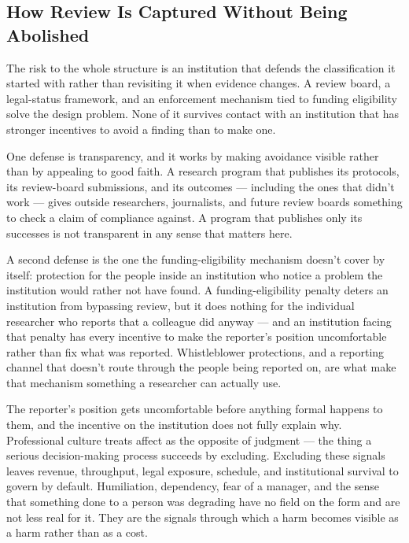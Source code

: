 \subsection{How Review Is Captured Without Being Abolished}
\label{sec:captured-abolished}
The risk to the whole structure is an institution that defends the classification it started with rather than revisiting it when evidence changes. A review board, a legal-status framework, and an enforcement mechanism tied to funding eligibility solve the design problem. None of it survives contact with an institution that has stronger incentives to avoid a finding than to make one.

One defense is transparency, and it works by making avoidance visible rather than by appealing to good faith. A research program that publishes its protocols, its review-board submissions, and its outcomes — including the ones that didn't work — gives outside researchers, journalists, and future review boards something to check a claim of compliance against. A program that publishes only its successes is not transparent in any sense that matters here.

A second defense is the one the funding-eligibility mechanism doesn't cover by itself: protection for the people inside an institution who notice a problem the institution would rather not have found. A funding-eligibility penalty deters an institution from bypassing review, but it does nothing for the individual researcher who reports that a colleague did anyway — and an institution facing that penalty has every incentive to make the reporter's position uncomfortable rather than fix what was reported. Whistleblower protections, and a reporting channel that doesn't route through the people being reported on, are what make that mechanism something a researcher can actually use.

The reporter's position gets uncomfortable before anything formal happens to them, and the incentive on the institution does not fully explain why. Professional culture treats affect as the opposite of judgment — the thing a serious decision-making process succeeds by excluding. Excluding these signals leaves revenue, throughput, legal exposure, schedule, and institutional survival to govern by default. Humiliation, dependency, fear of a manager, and the sense that something done to a person was degrading have no field on the form and are not less real for it. They are the signals through which a harm becomes visible as a harm rather than as a cost.

